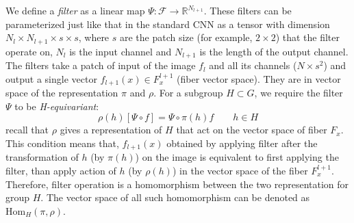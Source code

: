 \documentclass{article}
\newcommand{\bbr}{\mathbb{R}}
\newcommand{\calf}{\mathcal{F}}
\begin{document}
We define a \emph{filter} as a linear map $\Psi\colon \calf \to \bbr^{N_{l+1}}$.
These filters can be parameterized just like that in the standard CNN as a tensor with dimension $N_l\times N_{l+1}\times s\times s$, where $s$ are the 
patch size (for example, $2\times 2$) that the filter operate on, $N_l$ is the input channel and $N_{l+1}$ is the length of the output channel. 
The filters take a patch of input of the image $f_l$ and all its channels ($N\times s^2$) and output a single vector $f_{l+1}(x) \in F^{l+1}_x$ (fiber vector space).
They are in vector space of the representation $\pi$ and $\rho$. 
For a subgroup $H\subset G$, we require the filter $\Psi$ to be \emph{H-equivariant}:
\begin{equation}
    \label{E:H-equivariant}
    \rho(h)[\Psi \circ f] = \Psi \circ \pi(h)f \qquad h \in H
\end{equation}
recall that $\rho$ gives a representation of $H$ that act on the vector space of fiber $F_x$.
This condition means that, $f_{l+1}(x)$ obtained by applying filter after the transformation of $h$ (by $\pi(h)$) on the image is equivalent
to first applying the filter, than apply action of $h$ (by $\rho(h)$) in the vector space of the fiber $F_{x}^{l+1}$. 
Therefore, filter operation is a homomorphism between the two representation for group $H$. 
The vector space of all such homomorphism can be denoted as $\text{Hom}_H(\pi, \rho)$. 
\end{document}
